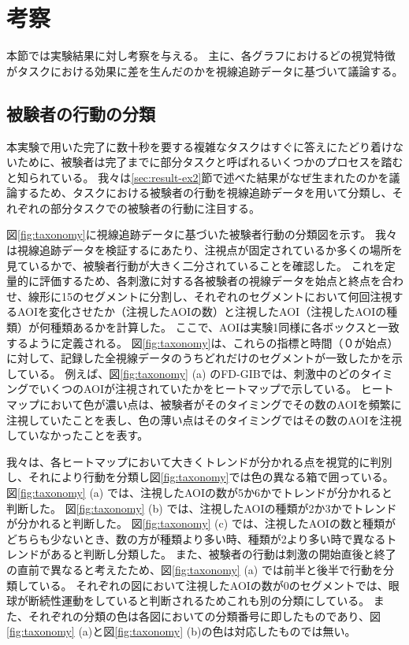 \documentclass{kuee}
\begin{document}
\section{考察}
本節では実験結果に対し考察を与える。
主に、各グラフにおけるどの視覚特徴がタスクにおける効果に差を生んだのかを視線追跡データに基づいて議論する。

\subsection{被験者の行動の分類}
本実験で用いた完了に数十秒を要する複雑なタスクはすぐに答えにたどり着けないために、被験者は完了までに部分タスクと呼ばれるいくつかのプロセスを踏むと知られている。
我々は\ref{sec:result-ex2}節で述べた結果がなぜ生まれたのかを議論するため、タスクにおける被験者の行動を視線追跡データを用いて分類し、それぞれの部分タスクでの被験者の行動に注目する。

図\ref{fig:taxonomy}に視線追跡データに基づいた被験者行動の分類図を示す。
我々は視線追跡データを検証するにあたり、注視点が固定されているか多くの場所を見ているかで、被験者行動が大きく二分されていることを確認した。
これを定量的に評価するため、各刺激に対する各被験者の視線データを始点と終点を合わせ、線形に15のセグメントに分割し、それぞれのセグメントにおいて何回注視するAOIを変化させたか（注視したAOIの数）と注視したAOI（注視したAOIの種類）が何種類あるかを計算した。
ここで、AOIは実験1同様に各ボックスと一致するように定義される。
図\ref{fig:taxonomy}は、これらの指標と時間（０が始点）に対して、記録した全視線データのうちどれだけのセグメントが一致したかを示している。
例えば、図\ref{fig:taxonomy} (a) のFD-GIBでは、刺激中のどのタイミングでいくつのAOIが注視されていたかをヒートマップで示している。
ヒートマップにおいて色が濃い点は、被験者がそのタイミングでその数のAOIを頻繁に注視していたことを表し、色の薄い点はそのタイミングではその数のAOIを注視していなかったことを表す。

我々は、各ヒートマップにおいて大きくトレンドが分かれる点を視覚的に判別し、それにより行動を分類し図\ref{fig:taxonomy}では色の異なる箱で囲っている。
図\ref{fig:taxonomy} (a) では、注視したAOIの数が5か6かでトレンドが分かれると判断した。
図\ref{fig:taxonomy} (b) では、注視したAOIの種類が2か3かでトレンドが分かれると判断した。
図\ref{fig:taxonomy} (c) では、注視したAOIの数と種類がどちらも少ないとき、数の方が種類より多い時、種類が2より多い時で異なるトレンドがあると判断し分類した。
また、被験者の行動は刺激の開始直後と終了の直前で異なると考えたため、図\ref{fig:taxonomy} (a) では前半と後半で行動を分類している。
それぞれの図において注視したAOIの数が0のセグメントでは、眼球が断続性運動をしていると判断されるためこれも別の分類にしている。
また、それぞれの分類の色は各図においての分類番号に即したものであり、図\ref{fig:taxonomy} (a)と図\ref{fig:taxonomy} (b)の色は対応したものでは無い。
\end{document}
